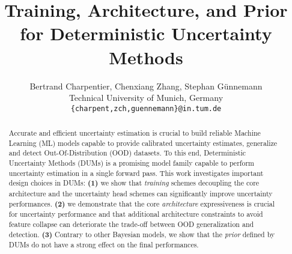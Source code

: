 \documentclass{article} %
\title{Training, Architecture, and Prior \\for Deterministic Uncertainty Methods}
\author{%
  Bertrand Charpentier, Chenxiang Zhang, Stephan Günnemann \\
  Technical University of Munich, Germany\\
  \texttt{\{charpent,zch,guennemann\}@in.tum.de} \\
}
\begin{document}
 


\maketitle

\begin{abstract}
Accurate and efficient uncertainty estimation is crucial to build reliable Machine Learning (ML) models capable to provide calibrated uncertainty estimates, generalize and detect Out-Of-Distribution (OOD) datasets. To this end, Deterministic Uncertainty Methods (DUMs) is a promising model family capable to perform uncertainty estimation in a single forward pass. This work investigates important design choices in DUMs: 
\textbf{(1)} we show that \emph{training} schemes decoupling the core architecture and the uncertainty head schemes can significantly improve uncertainty performances. 
\textbf{(2)} we demonstrate that the core \emph{architecture} expressiveness is crucial for uncertainty performance and that additional architecture constraints to avoid feature collapse can deteriorate the trade-off between OOD generalization and detection. 
\textbf{(3)} Contrary to other Bayesian models, we show that the \emph{prior} defined by DUMs do not have a strong effect on the final performances.
\end{abstract}


% 






\newpage



\newpage

\end{document}
